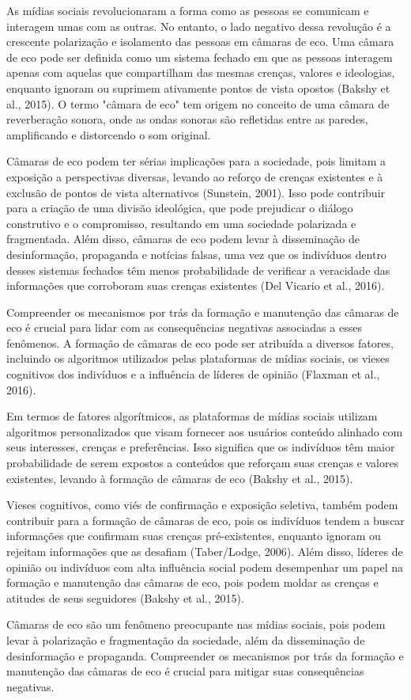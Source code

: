 As mídias sociais revolucionaram a forma como as pessoas se comunicam e interagem umas com as outras. No entanto, o lado negativo dessa revolução é a crescente polarização e isolamento das pessoas em câmaras de eco. Uma câmara de eco pode ser definida como um sistema fechado em que as pessoas interagem apenas com aquelas que compartilham das mesmas crenças, valores e ideologias, enquanto ignoram ou suprimem ativamente pontos de vista opostos (Bakshy et al., 2015). O termo "câmara de eco" tem origem no conceito de uma câmara de reverberação sonora, onde as ondas sonoras são refletidas entre as paredes, amplificando e distorcendo o som original.

Câmaras de eco podem ter sérias implicações para a sociedade, pois limitam a exposição a perspectivas diversas, levando ao reforço de crenças existentes e à exclusão de pontos de vista alternativos (Sunstein, 2001). Isso pode contribuir para a criação de uma divisão ideológica, que pode prejudicar o diálogo construtivo e o compromisso, resultando em uma sociedade polarizada e fragmentada. Além disso, câmaras de eco podem levar à disseminação de desinformação, propaganda e notícias falsas, uma vez que os indivíduos dentro desses sistemas fechados têm menos probabilidade de verificar a veracidade das informações que corroboram suas crenças existentes (Del Vicario et al., 2016).

Compreender os mecanismos por trás da formação e manutenção das câmaras de eco é crucial para lidar com as consequências negativas associadas a esses fenômenos. A formação de câmaras de eco pode ser atribuída a diversos fatores, incluindo os algoritmos utilizados pelas plataformas de mídias sociais, os vieses cognitivos dos indivíduos e a influência de líderes de opinião (Flaxman et al., 2016).

Em termos de fatores algorítmicos, as plataformas de mídias sociais utilizam algoritmos personalizados que visam fornecer aos usuários conteúdo alinhado com seus interesses, crenças e preferências. Isso significa que os indivíduos têm maior probabilidade de serem expostos a conteúdos que reforçam suas crenças e valores existentes, levando à formação de câmaras de eco (Bakshy et al., 2015).

Vieses cognitivos, como viés de confirmação e exposição seletiva, também podem contribuir para a formação de câmaras de eco, pois os indivíduos tendem a buscar informações que confirmam suas crenças pré-existentes, enquanto ignoram ou rejeitam informações que as desafiam (Taber/Lodge, 2006). Além disso, líderes de opinião ou indivíduos com alta influência social podem desempenhar um papel na formação e manutenção das câmaras de eco, pois podem moldar as crenças e atitudes de seus seguidores (Bakshy et al., 2015).

Câmaras de eco são um fenômeno preocupante nas mídias sociais, pois podem levar à polarização e fragmentação da sociedade, além da disseminação de desinformação e propaganda. Compreender os mecanismos por trás da formação e manutenção das câmaras de eco é crucial para mitigar suas consequências negativas.